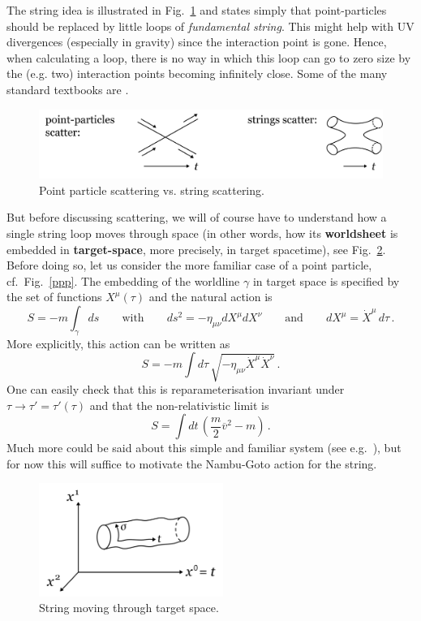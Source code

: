 \documentclass[12pt]{article}
\newcommand{\be}{\begin{equation}}
\newcommand{\ee}{\end{equation}}
\newcommand{\ol}{\overline}
\numberwithin{equation}{section}
\begin{document}
The string idea is illustrated in Fig.~\ref{ssc} and states simply that point-particles should be replaced by little loops of {\it fundamental string}. This might help with UV divergences (especially in gravity) since the interaction point is gone. Hence, when calculating a loop, there is no way in which this loop can go to zero size by the (e.g. two) interaction points 
becoming infinitely close. Some of the many standard textbooks are \cite{Green:1987sp, Polchinski:1998rq, Blumenhagen:2013fgp, bbs, kir}. 

\begin{figure}[ht]
\begin{center} 
\includegraphics[width=12cm]{ssc.png}
\caption{Point particle scattering vs. string scattering.}
\label{ssc} 
\end{center}
\end{figure}

But before discussing scattering, we will of course have to understand how a single string loop moves through space (in other words, how its {\bf worldsheet} is embedded in {\bf target-space}, more precisely, in target spacetime), see Fig.~\ref{its}. Before doing so, let us consider the more familiar case of a point particle, cf.~Fig.~\ref{ppp}. The embedding of the worldline $\gamma$ in target space is specified by the set of functions $X^\mu(\tau)$ and the natural action is 
\be
S=-m\int_\gamma ds\qquad\mbox{with}\qquad ds^2=-\eta_{\mu\nu}dX^\mu dX^\nu\qquad \mbox{and}\qquad dX^\mu=\dot{X}^\mu\,d\tau\,.
\ee
More explicitly, this action can be written as
\be
S=-m\int d\tau\,\sqrt{-\eta_{\mu\nu}\dot{X}^\mu\dot{X}^\nu}\,.
\ee
One can easily check that this is reparameterisation invariant under $\tau\to \tau'=\tau'(\tau)$ and that the non-relativistic limit is 
\be
S=\int dt\,\left(\frac{m}{2}\ol{v}^2-m\right)\,.
\ee
Much more could be said about this simple and familiar system (see e.g.~\cite{zw}), but for now this will suffice to motivate the Nambu-Goto action for the string.

\begin{figure}[ht]
\begin{center} 
\includegraphics[width=6cm]{its.png}
\caption{String moving through target space.}
\label{its} 
\end{center}
\end{figure}
\end{document}
